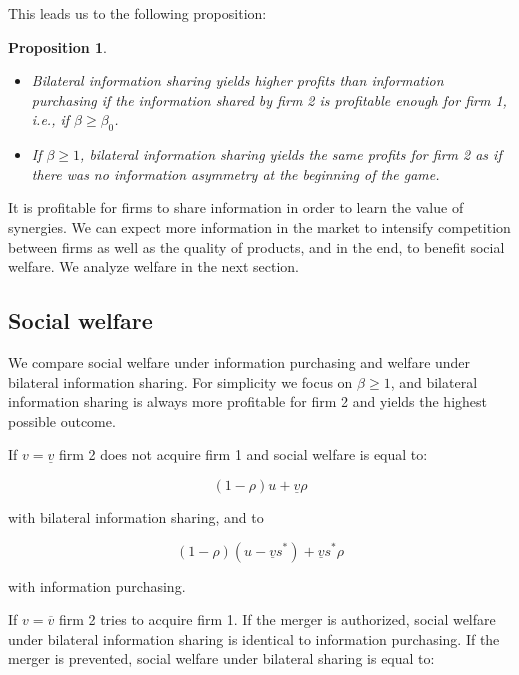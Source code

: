 \documentclass[a4paper,leqno]{article}%
\newtheorem{prop}{Proposition}
\newcommand{\uv}{\underline{v}}
\newcommand{\ov}{\overline{v}}
\begin{document}
\medskip

This leads us to the following proposition:

\begin{prop}~~
\begin{itemize}
    \item Bilateral information sharing yields higher profits than information purchasing if the information shared by firm 2 is profitable enough for firm 1, i.e., if $\beta\geq\beta_0$.
    \item If $\beta\geq 1$, bilateral information sharing yields the same profits for firm 2 as if there was no information asymmetry at the beginning of the game.
\end{itemize}

\end{prop}

\noindent It is profitable for firms to share information in order to learn the value of synergies. We can expect more information in the market to intensify competition between firms as well as the quality of products, and in the end, to benefit social welfare. We analyze welfare in the next section.

\medskip

\subsection{Social welfare}

\medskip

We compare social welfare under information purchasing and welfare under bilateral information sharing. For simplicity we focus on $\beta\geq1$, and bilateral information sharing is always more profitable for firm 2 and yields the highest possible outcome.

\medskip

If $v=\uv$ firm 2 does not acquire firm 1 and social welfare is equal to:

\[
(1-\rho) u+\uv \rho
\]

with bilateral information sharing, and to

\[
(1-\rho) (u-\uv s^*)+\uv s^*\rho
\]

with information purchasing.

\medskip

If $v=\ov$ firm 2 tries to acquire firm 1. If the merger is authorized, social welfare under bilateral information sharing is identical to information purchasing. If the merger is prevented, social welfare under bilateral sharing is equal to:
\end{document}
